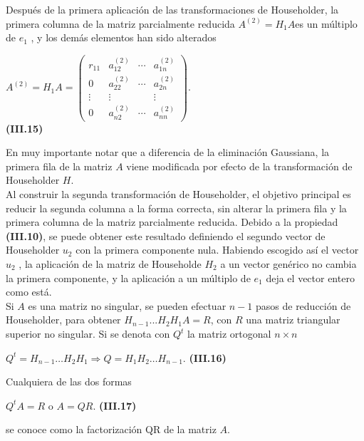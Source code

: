 \documentclass[twocolumn,twoside]{article}
\begin{document}
Despu\'es de la primera aplicaci\'on de las transformaciones de Householder, la primera
columna de la matriz parcialmente reducida $A^{(2)}=H_1 A $es un m\'ultiplo de $e_1$ , y los
dem\'as elementos han sido alterados
\begin{center}
  $A^{(2)}= H_1 A=\left(\begin{array}{cccc}
    r_{11} &a_{12}^{(2)} &\cdots &a_{1n}^{(2)} \\ 
    0 &a_{22}^{(2)} &\cdots &a_{2n}^{(2)} \\
    \vdots &\vdots &  &\vdots \\
    0 &a_{n2}^{(2)} &\cdots &a_{nn}^{(2)} 
   \end{array}\right)$. \vspace{0.2cm}\\\textbf{(III.15)}
\end{center}
En muy importante notar que a diferencia de la eliminaci\'on Gaussiana, la primera fila de
la matriz $A$ viene modificada por efecto de la transformaci\'on de Householder $H$.\\
Al construir la segunda transformaci\'on de Householder, el objetivo principal es reducir
la segunda columna a la forma correcta, sin alterar la primera fila y la primera
columna de la matriz parcialmente reducida. Debido a la propiedad \textbf{(III.10)}, se puede
obtener este resultado definiendo el segundo vector de Householder $u_2$ con la primera
componente nula. Habiendo escogido as\'i el vector $u_2$ , la aplicaci\'on de la matriz de
Householde $H_2$ a un vector gen\'erico no cambia la primera componente, y la aplicaci\'on a
un m\'ultiplo de $e_1$ deja el vector entero como est\'a.\\
Si $A$ es una matriz no singular, se pueden efectuar $n-1$ pasos de reducci\'on de
Householder, para obtener $H_{n-1} . . . H_2 H_1 A = R$, con $R$ una matriz triangular superior
no singular. Si se denota con $Q^t$ la matriz ortogonal $n\times n$
\begin{center}
  $Q^t = H_{n−1}\dots H_2 H_1 \Longrightarrow  Q = H_1 H_2 \dots H_{n−1}$. \textbf{(III.16)}
\end{center}
Cualquiera de las dos formas
\begin{center}
  $Q^t A = R$  \hspace{0.25cm}  o \hspace{0.25cm} $A = QR$. \hspace{0.5cm}\textbf{(III.17)}
\end{center}
se conoce como la factorizaci\'on QR de la matriz $A$.\\
\end{document}

